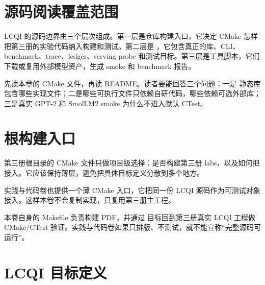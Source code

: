 \section{源码阅读覆盖范围}

LCQI 的源码边界由三个层次组成。第一层是仓库构建入口，它决定 CMake 怎样把第三册的实验代码纳入构建和测试。第二层是 ，它包含真正的库、CLI、benchmark、trace、ledger、serving probe 和测试目标。第三层是工具脚本，它们下载或复用外部模型资产，生成 smoke 和 benchmark 报告。

\begin{sourcereadingbox}
先读本章的 CMake 文件，再读 README。读者要能回答三个问题：一是  静态库包含哪些实现文件；二是哪些可执行文件只依赖自研代码，哪些依赖可选外部库；三是真实 GPT-2 和 SmolLM2 smoke 为什么不进入默认 CTest。
\end{sourcereadingbox}

\section{根构建入口}

第三册根目录的 CMake 文件只做项目级选择：是否构建第三册 labs，以及如何把  接入。它应该保持薄层，避免把具体目标定义分散到多个地方。





实践与代码卷也提供一个薄 CMake 入口，它把同一份 LCQI 源码作为可测试对象接入。这样本卷不会复制实现，只复用第三册主工程。



本卷自身的 Makefile 负责构建 PDF，并通过  目标回到第三册真实 LCQI 工程做 CMake/CTest 验证。实践与代码卷如果只排版、不测试，就不能宣称“完整源码可运行”。





\section{LCQI 目标定义}

